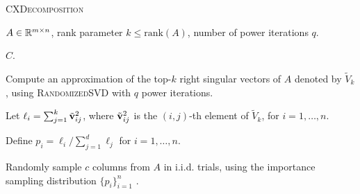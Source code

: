  \begin{algorithm}[tb]
 \caption{\textsc{CXDecomposition}}
  \label{alg:cx}
  \begin{algorithmic}[1]
    \Require $A \in \mathbb{R}^{m\times n}$, rank parameter $k \leq \textrm{rank}(A)$, number of power iterations $q$.

    \Ensure $C$.
    

    \State Compute an approximation of the top-$k$ right singular vectors of $A$ denoted by $\tilde V_k$, using \textsc{RandomizedSVD} with $q$ power iterations.
    
    \State Let $\ell_i = \sum_{j=1}^k \tilde {\mathbf{v}}_{ij}^2$, where $\tilde {\mathbf{v}}_{ij}^2$ is the $(i,j)$-th element of $\tilde V_k$, for $i = 1, \ldots, n$. 
    
    \State Define $p_i = \ell_i / \sum_{j=1}^d \ell_j$ for $i=1,\ldots,n$.
    
    \State Randomly sample $c$ columns from $A$ in i.i.d. trials, using the importance sampling distribution $\{p_i\}_{i=1}^n$ .

    

    \end{algorithmic}
\end{algorithm}


